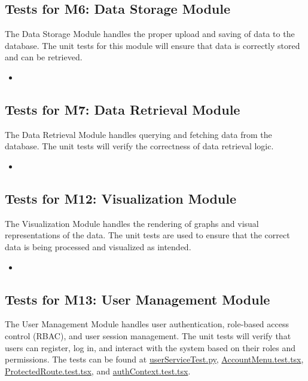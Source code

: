 \documentclass[12pt, titlepage]{article}
\begin{document}
\subsection{Tests for M6: Data Storage Module}

The Data Storage Module handles the proper upload and saving of data to the
database. The unit tests for this module will ensure that data is correctly
stored and can be retrieved.

\begin{itemize}
  \item
\end{itemize}

\subsection{Tests for M7: Data Retrieval Module}

The Data Retrieval Module handles querying and fetching data from the database.
The unit tests will verify the correctness of data retrieval logic.

\begin{itemize}
  \item
\end{itemize}

\subsection{Tests for M12: Visualization Module}

The Visualization Module handles the rendering of graphs and visual
representations of the data. The unit tests are used to ensure that the correct
data is being processed and visualized as intended.

\begin{itemize}
  \item
\end{itemize}

\subsection{Tests for M13: User Management Module}

The User Management Module handles user authentication, role-based access
control (RBAC), and user session management. The unit tests will verify that
users can register, log in, and interact with the system based on their roles
and permissions. The tests can be found at
\href{https://github.com/SumanyaG/Alkalytics/blob/main/src/backend/test/userServiceTest.py}{userServiceTest.py}, 
\href{https://github.com/SumanyaG/Alkalytics/blob/main/src/frontend/test/components/auth/AccountMenu.test.tsx}{AccountMenu.test.tsx},
\href{https://github.com/SumanyaG/Alkalytics/blob/main/src/frontend/test/components/auth/ProtectedRoute.test.tsx}{ProtectedRoute.test.tsx},
and \href{https://github.com/SumanyaG/Alkalytics/blob/main/src/frontend/test/context/authContext.test.tsx}{authContext.test.tsx}.
\end{document}
